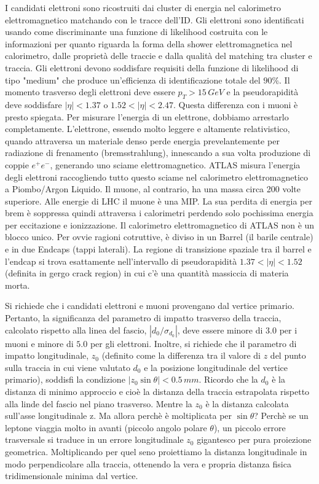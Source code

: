 \documentclass[11pt]{article}
\begin{document}
I candidati elettroni sono ricostruiti dai cluster di energia nel calorimetro elettromagnetico matchando con le tracce dell'ID. Gli elettroni sono identificati usando come discriminante una funzione di likelihood costruita con le informazioni per quanto riguarda la forma della shower elettromagnetica nel calorimetro, dalle proprietà delle traccie e dalla qualità del matching tra cluster e traccia. Gli elettroni devono soddisfare requisiti della funzione di likelihood di tipo "medium" che produce un'efficienza di identificazione totale del $90\%$. Il momento trasverso degli elettroni deve essere $p_T>15\,\unit{GeV}$ e la pseudorapidità deve soddisfare $|\eta|<1.37$ o $1.52<|\eta|<2.47$. Questa differenza con i muoni è presto spiegata. Per misurare l'energia di un elettrone, dobbiamo arrestarlo completamente. L'elettrone, essendo molto leggere e altamente relativistico, quando attraversa un materiale denso perde energia prevelantemente per radiazione di frenamento (bremsstrahlung), innescando a sua volta produzione di coppie $e^+e^-$, generando uno sciame elettromagnetico. ATLAS misura l'energia degli elettroni raccogliendo tutto questo sciame nel calorimetro elettromagnetico a Piombo/Argon Liquido. Il muone, al contrario, ha una massa circa 200 volte superiore. Alle energie di LHC il muone è una MIP. La sua perdita di energia per brem è soppressa quindi attraversa i calorimetri perdendo solo pochissima energia per eccitazione e ionizzazione. Il calorimetro elettromagnetico di ATLAS non è un blocco unico. Per ovvie ragioni cotruttive, è diviso in un Barrel (il barile centrale) e in due Endcaps (tappi laterali). La regione di transizione spaziale tra il barrel e l'endcap si trova esattamente nell'intervallo di pseudorapidità $1.37<|\eta|<1.52$ (definita in gergo crack region) in cui c'è una quantità massiccia di materia morta. 

Si richiede che i candidati elettroni e muoni provengano dal vertice primario. Pertanto, la significanza del parametro di impatto trasverso della traccia, calcolato rispetto alla linea del fascio, $|d_0/\sigma_{d_0}|$, deve essere minore di $3.0$ per i muoni e minore di $5.0$ per gli elettroni. Inoltre, si richiede che il parametro di impatto longitudinale, $z_0$ (definito come la differenza tra il valore di $z$ del punto sulla traccia in cui viene valutato $d_0$ e la posizione longitudinale del vertice primario), soddisfi la condizione $|z_0 \sin\theta| < 0.5\,\unit{mm}$. Ricordo che la $d_0$ è la distanza di minimo approccio e cioè la distanza della traccia estrapolata rispetto alla linde del fascio nel piano trasverso. Mentre la $z_0$ è la distanza calcolata sull'asse longitudinale z. Ma allora perchè è moltiplicata per $\sin\theta$? Perchè se un leptone viaggia molto in avanti (piccolo angolo polare $\theta$), un piccolo errore trasversale si traduce in un errore longitudinale $z_0$ gigantesco per pura proiezione geometrica. Moltiplicando per quel seno proiettiamo la distanza longitudinale in modo perpendicolare alla traccia, ottenendo la vera e propria distanza fisica tridimensionale minima dal vertice. 
\end{document}
